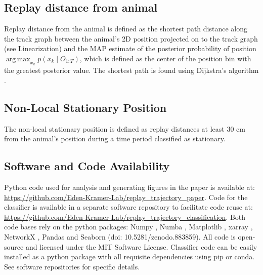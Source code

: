 \documentclass[times, twoside]{zHenriquesLab-StyleBioRxiv}
\DeclareMathOperator*{\argmax}{arg\,max}
\begin{document}
\subsection*{Replay distance from animal}
Replay distance from the animal is defined as the shortest path distance along the track graph between the animal's 2D position projected on to the track graph (see Linearization) and the MAP estimate of the posterior probability of position $\argmax_{x_k} p(x_{k} \mid O_{1:T})$, which is defined as the center of the position bin with the greatest posterior value. The shortest path is found using Dijkstra's algorithm \cite{Dijkstranotetwoproblems1959}.

\subsection*{Non-Local Stationary Position}
The non-local stationary position is defined as replay distances at least 30 cm from the animal's position during a time period classified as stationary.

\subsection*{Software and Code Availability}
Python code used for analysis and generating figures in the paper is available at: \url{https://github.com/Eden-Kramer-Lab/replay_trajectory_paper}. Code for the classifier is available in a separate software repository to facilitate code reuse at: \url{https://github.com/Eden-Kramer-Lab/replay_trajectory_classification}.
Both code bases rely on the python packages: Numpy \cite{vanderWaltNumPyArrayStructure2011}, Numba \cite{LamNumbaLLVMbasedPython2015}, Matplotlib \cite{HunterMatplotlib2DGraphics2007}, xarray \cite{HoyerxarrayNDlabeled2017}, NetworkX \cite{HagbergExploringNetworkStructure2008}, Pandas \cite{McKinneyDataStructuresStatistical2010} and Seaborn (doi: 10.5281/zenodo.883859). All code is open-source and licensed under the MIT Software License. Classifier code can be easily installed as a python package with all requisite dependencies using pip or conda. See software repositories for specific details.

\newpage

\beginsupplement
\captionsetup*{format=largeformat}
\end{document}
